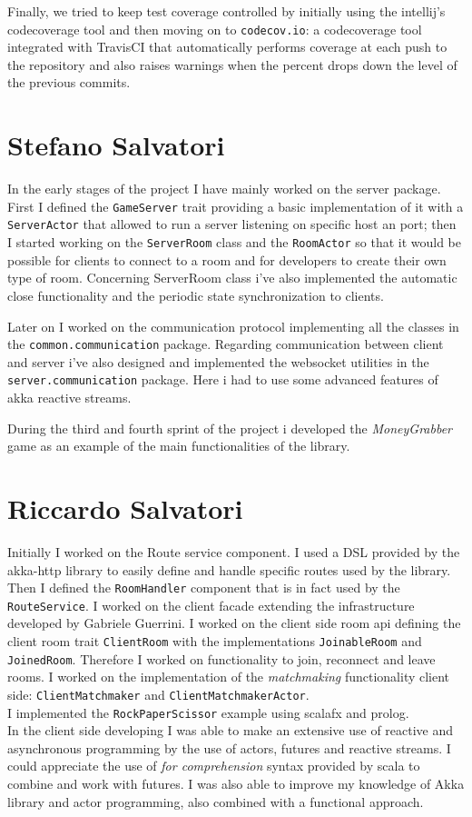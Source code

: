 Finally, we tried to keep test coverage controlled by initially using the intellij's codecoverage tool and then moving on to \texttt{codecov.io}: a codecoverage tool integrated with TravisCI that automatically performs coverage at each push to the repository and also raises warnings when the percent drops down the level of the previous commits. 



\section{Stefano Salvatori}
In the early stages of the project I have mainly worked on the server package. First I defined the \texttt{GameServer} trait providing a basic implementation of it with a \texttt{ServerActor} that allowed to run a server listening on specific host an port; then I started working on the \texttt{ServerRoom} class and the \texttt{RoomActor} so that it would be possible for clients to connect to a room and for developers to create their own type of room. Concerning ServerRoom class i've also implemented the automatic close functionality and the periodic state synchronization to clients.

Later on I worked on the communication protocol implementing all the classes in the \texttt{common.communication} package. Regarding communication between client and server i've also designed and implemented the websocket utilities in the \texttt{server.communication} package. Here i had to use some advanced features of akka reactive streams. 

During the third and fourth sprint of the project i developed the \textit{MoneyGrabber} game as an example of the main functionalities of the library. 



\section{Riccardo Salvatori}
Initially I worked on the Route service component. I used a DSL provided by the akka-http library to easily define and handle specific routes used by the library. Then I defined the \texttt{RoomHandler} component that is in fact used by the \texttt{RouteService}.
I worked on the client facade extending the infrastructure developed by Gabriele Guerrini. I worked on the client side room api defining the client room trait \texttt{ClientRoom} with the implementations \texttt{JoinableRoom} and \texttt{JoinedRoom}. Therefore I worked on functionality to join, reconnect and leave rooms.
I worked on the implementation of the \textit{matchmaking} functionality client side: \texttt{ClientMatchmaker} and \texttt{ClientMatchmakerActor}.
\\
I implemented the \texttt{RockPaperScissor} example using scalafx and prolog.
\\
In the client side developing I was able to make an extensive use of reactive and asynchronous programming by the use of actors, futures and reactive streams.
I could appreciate the use of \textit{for comprehension} syntax provided by scala to combine and work with futures.
I was also able to improve my knowledge of Akka library and actor programming, also combined with a functional approach.

